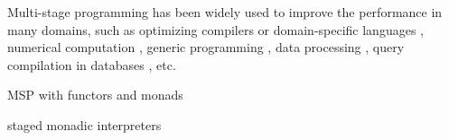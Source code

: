 Multi-stage programming has been widely used to improve the performance in many
domains, such as optimizing compilers or domain-specific languages
\cite{DBLP:conf/pldi/RompfSBLCO14, DBLP:conf/snapl/RompfBLSJAOSKDK15,
DBLP:journals/tecs/SujeethBLRCOO14, DBLP:conf/gpce/SujeethGBLROO13,
DBLP:journals/jfp/CaretteKS09}, numerical computation \cite{PGL-038,
DBLP:conf/pepm/AktemurKKS13}, generic programming
\cite{DBLP:journals/pacmpl/Yallop17, Ofenbeck:2017:SGP:3136040.3136060}, data
processing \cite{DBLP:conf/oopsla/JonnalageddaCSRO14,
DBLP:conf/popl/KiselyovBPS17}, query compilation in databases
\cite{DBLP:conf/osdi/EssertelTDBOR18, DBLP:conf/sigmod/TahboubER18}, etc.

MSP with functors and monads \cite{10.1007/11561347_18}

staged monadic interpreters \cite{DBLP:conf/dsl/SheardBP99}
